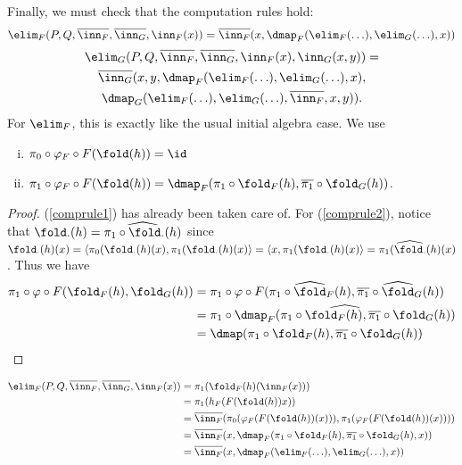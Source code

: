 \documentclass{article}
\begin{document}
Finally, we must check that the computation rules hold:
\[
\elim_F(P, Q, \overline{\inn_F}, \overline{\inn_G}, \inn_F(x)) = 
\overline{\inn_F}(x, \dmap_F(\elim_F(\ldots), \elim_G(\ldots), x))
\]
\begin{multline*}
\elim_G(P, Q, \overline{\inn_F}, \overline{\inn_G}, \inn_F(x), \inn_G(x, y)) = \\
\overline{\inn_G}(x, y, \dmap_F(\elim_F(\ldots), \elim_G(\ldots), x),  \\ \dmap_G(\elim_F(\ldots), \elim_G(\ldots), \overline{\inn_F}, x, y)).
\end{multline*}
For $\elim_F$, this is exactly like the usual initial algebra case. We use
\begin{lemma}
  \begin{enumerate}[(i)]
  \item $\pi_0 \circ \varphi_F \circ F(\fold(h)) = \id$ \label{comprule1}
  \item $\pi_1 \circ \varphi_F \circ F(\fold(h)) =
    \dmap_F(\pi_1\circ\fold_F(h), \overline{\pi_1} \circ
    \fold_G(h))$. \label{comprule2}
  \end{enumerate}
\end{lemma}
\begin{proof}
  (\ref{comprule1}) has already been taken care of. For
  (\ref{comprule2}), notice that $\fold_\cdot(h) =
  \widehat{\pi_1 \circ \fold_\cdot(h)}$ since $\fold_\cdot(h)(x) = \langle
  \pi_0(\fold_\cdot(h)(x), \pi_1(\fold_\cdot(h)(x)\rangle = \langle x,
  \pi_1(\fold_\cdot(h)(x)\rangle =
  \widehat{\pi_1(\fold_\cdot(h)}(x)$. Thus we have
  \begin{align*}
    \pi_1 \circ \varphi \circ F(\fold_F(h), \fold_G(h))
      &= \pi_1 \circ \varphi \circ F(\widehat{\pi_1 \circ \fold_F(h)},\widehat{\overline{\pi_1} \circ \fold_G(h)}) \\
      &= \pi_1 \circ \widehat{\dmap_F(\pi_1 \circ \fold_F(h), \overline{\pi_1} \circ \fold_G(h))} \\
      &= \dmap(\pi_1 \circ \fold_F(h), \overline{\pi_1} \circ \fold_G(h))
  \end{align*}
\end{proof}

\begin{align*}
\elim_F(P, Q, \overline{\inn_F}, \overline{\inn_G}, \inn_F(x))
& = \pi_1(\fold_F(h)(\inn_F(x))) \\
& = \pi_1(h_F(F(\fold(h))x)) \\
&= \overline{\inn_F}(\pi_0(\varphi_F(F(\fold(h))(x))), \pi_1(\varphi_F(F(\fold(h))(x)))) \\
&= \overline{\inn_F}(x, \dmap_F(\pi_1\circ\fold_F(h), \overline{\pi_1} \circ \fold_G(h), x)) \\
&= \overline{\inn_F}(x, \dmap_F(\elim_F(\ldots), \elim_G(\ldots), x))
\end{align*}
\end{document}
